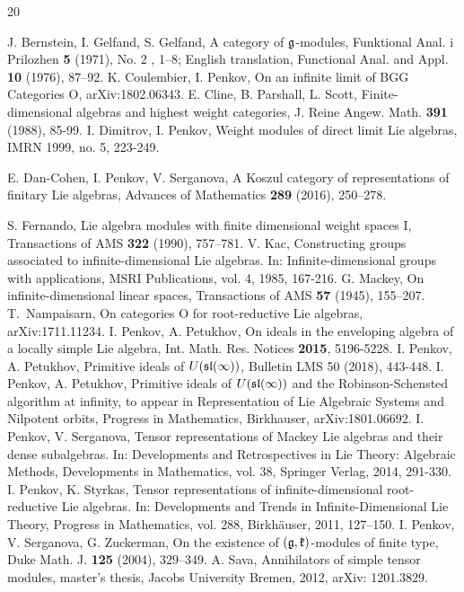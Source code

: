 \documentclass[12pt]{amsart}
\def\mathfrak{\frak}
\def\textbf#1{{\bf #1}}
\theoremstyle{plain} %
\numberwithin{equation}{section}
\theoremstyle{definition}
\theoremstyle{remark}
\theoremstyle{plain} %
\begin{document}
\begin{thebibliography}{20}


 J. Bernstein, I.  Gelfand, S. Gelfand, {A category of $\mathfrak{g}$-modules}, Funktional Anal. i Prilozhen {\bf5} (1971), No. 2 , 1--8; English translation, Functional Anal. and Appl. {\bf10} (1976), 87--92.
 K. Coulembier, I. Penkov,  {On an infinite limit of BGG Categories O}, arXiv:1802.06343.
 E. Cline, B. Parshall, L. Scott, {Finite-dimensional algebras and highest weight categories}, J. Reine Angew. Math. \textbf{391} (1988), 85-99.
 I. Dimitrov, I. Penkov, {Weight modules of direct limit Lie algebras}, IMRN 1999, no. 5, 223-249.

 E. Dan-Cohen, I. Penkov, V. Serganova, {A Koszul category of representations of finitary Lie algebras}, Advances of Mathematics {\bf 289} (2016), 250--278.


  S. Fernando, {Lie algebra modules with finite dimensional weight spaces I}, Transactions of AMS \textbf{322} (1990), 757--781.
 V. Kac, {Constructing groups associated to  infinite-dimensional Lie algebras}. In: Infinite-dimensional groups with applications, MSRI Publications, vol. 4, 1985, 167-216.    
 G. Mackey, {On infinite-dimensional linear spaces},  Transactions of AMS {\bf57} (1945), 155--207.
	T.~Nampaisarn, On categories O for root-reductive Lie algebras,  arXiv:1711.11234.
 I. Penkov, A. Petukhov, {On ideals in the enveloping algebra of a locally simple Lie algebra},  Int. Math. Res. Notices  {\bf 2015}, 5196-5228.
 I. Penkov, A. Petukhov, {Primitive ideals of $U(\mathfrak{sl}(\infty))$}, Bulletin LMS {50 (2018), 443-448}.
 I. Penkov, A. Petukhov, {Primitive ideals of $U(\mathfrak{sl}(\infty))$ and the Robinson-Schensted algorithm at infinity}, {to appear in Representation of Lie Algebraic Systems and Nilpotent orbits, Progress in Mathematics, Birkhauser}, arXiv:1801.06692.
 I. Penkov, V. Serganova, {Tensor representations of Mackey Lie algebras and their dense subalgebras}. In: Developments and Retrospectives in Lie Theory: Algebraic Methods, Developments in Mathematics, vol. 38, Springer Verlag, 2014, 291-330.
 I. Penkov, K. Styrkas, {Tensor representations of infinite-dimensional root-reductive Lie algebras}. In: Developments and Trends in Infinite-Dimensional Lie Theory, Progress in Mathematics, vol. 288, Birkh\"auser, 2011, 127--150.
 I. Penkov, V. Serganova, G. Zuckerman, {On the existence of $(\mathfrak{g},\mathfrak{k})$-modules of finite type}, Duke Math. J. \textbf{125} (2004), 329--349.
 A. Sava, {Annihilators of simple tensor modules}, master{'}s thesis, Jacobs University Bremen, 2012, arXiv: 1201.3829.
\end{thebibliography}
\end{document}
